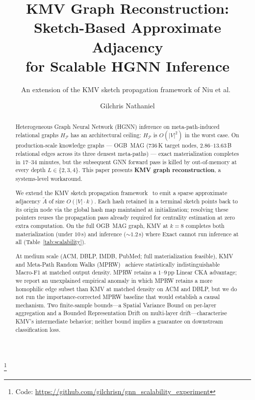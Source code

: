 \documentclass[sigconf]{acmart}
\begin{document}
\title{KMV Graph Reconstruction: Sketch-Based Approximate Adjacency\\for Scalable HGNN Inference}
\subtitle{An extension of the KMV sketch propagation framework of Niu et al.~\cite{berahmand2024kmv}}
\thanks{Code: \url{https://github.com/gilchrisn/gnn_scalability_experiment}}

\author{Gilchris Nathaniel}

\begin{abstract}
Heterogeneous Graph Neural Network (HGNN) inference on meta-path-induced relational graphs $H_\mathcal{P}$ has an architectural ceiling: $H_\mathcal{P}$ is $O(|V|^2)$ in the worst case. On production-scale knowledge graphs --- OGB~MAG ($736$\,K target nodes, $2.86$--$13.63$\,B relational edges across its three densest meta-paths) --- exact materialization completes in $17$--$34$ minutes, but the subsequent GNN forward pass is killed by out-of-memory at every depth $L\in\{2,3,4\}$. This paper presents \textbf{KMV graph reconstruction}, a systems-level workaround.

We extend the KMV sketch propagation framework~\cite{berahmand2024kmv} to emit a sparse approximate adjacency $\widetilde{A}$ of size $O(|V|\cdot k)$. Each hash retained in a terminal sketch points back to its origin node via the global hash map maintained at initialization; resolving these pointers reuses the propagation pass already required for centrality estimation at zero extra computation. On the full OGB~MAG graph, KMV at $k{=}8$ completes both materialization (under $10$\,s) and inference ($\sim$$1.2$\,s) where Exact cannot run inference at all (Table~\ref{tab:scalability}).

At medium scale (ACM, DBLP, IMDB, PubMed; full materialization feasible), KMV and Meta-Path Random Walks (MPRW)~\cite{dong2017metapath2vec} achieve statistically indistinguishable Macro-F1 at matched output density. MPRW retains a $1$--$9$\,pp Linear CKA advantage; we report an unexplained empirical anomaly in which MPRW retains a more homophilic edge subset than KMV at matched density on ACM and DBLP, but we do not run the importance-corrected MPRW baseline that would establish a causal mechanism. Two finite-sample bounds---a Spatial Variance Bound on per-layer aggregation and a Bounded Representation Drift on multi-layer drift---characterise KMV's intermediate behavior; neither bound implies a guarantee on downstream classification loss.
\end{abstract}
\end{document}
